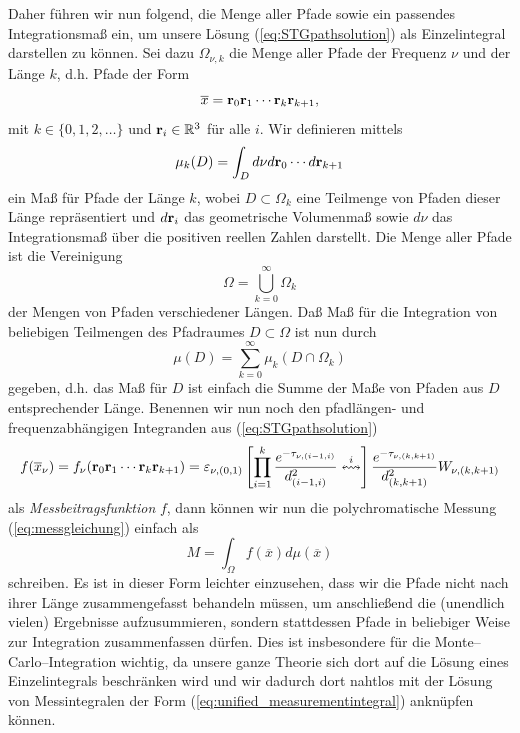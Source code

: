 	Daher führen wir nun \citet[][8.2]{Veach:1997p9136} folgend, die Menge aller Pfade sowie ein passendes Integrationsmaß ein, um unsere Lösung (\ref{eq:STGpathsolution}) als Einzelintegral darstellen zu können. Sei dazu $\Omega_{\nu,k}$ die Menge aller Pfade der Frequenz $\nu$ und der Länge $k$, d.h. Pfade der Form
	$${\overline x}=\mathbf{r}_0\mathbf{r}_1\cdots\mathbf{r}_k\mathbf{r}_{k+1},$$
	mit $k\in\{0,1,2,\dots\}$ und $\mathbf{r}_i \in \mathbb{R}^3$ für alle $i$. Wir definieren mittels
	$$\mu_k(D)=\int_D d\nu d\mathbf{r}_0\cdots d\mathbf{r}_{k+1}$$
	ein Maß für Pfade der Länge $k$, wobei $D\subset\Omega_k$ eine Teilmenge von Pfaden dieser Länge repräsentiert und $d\mathbf{r}_i$ das geometrische Volumenmaß sowie $d\nu$ das Integrationsmaß über die positiven reellen Zahlen darstellt. Die Menge aller Pfade ist die Vereinigung
	$$\Omega=\bigcup_{k=0}^\infty \Omega_k$$
	der Mengen von Pfaden verschiedener Längen. Daß Maß für die Integration von beliebigen Teilmengen des Pfadraumes $D\subset\Omega$ ist nun durch
	$$\mu(D)=\sum_{k=0}^\infty \mu_k(D\cap\Omega_k)$$
	gegeben, d.h. das Maß für $D$ ist einfach die Summe der Maße von Pfaden aus $D$ entsprechender Länge. Benennen wir nun noch den pfadlängen- und frequenzabhängigen Integranden aus (\ref{eq:STGpathsolution})
	\begin{equation}
		f({\overline x}_\nu)=f_\nu(\mathbf{r}_0\mathbf{r}_1\cdots\mathbf{r}_k\mathbf{r}_{k+1})=\varepsilon_{\nu,(0,1)}\left[\prod_{i=1}^k\frac{e^{-\tau_{\nu,(i-1,i)}}}{d_{(i-1,i)}^2}\overset{i}{\leftrightsquigarrow}\right]\frac{e^{-\tau_{\nu,(k,k+1)}}}{d_{(k,k+1)}^2} W_{\nu,(k,k+1)}
		\label{eq:mcf}
	\end{equation}
	als {\em Messbeitragsfunktion} $f$, dann können wir nun die polychromatische Messung (\ref{eq:messgleichung}) einfach als
	\begin{equation}
		M=\int_\Omega f({\overline x})d\mu({\overline x})
		\label{eq:unified_measurementintegral}
	\end{equation}
	schreiben. Es ist in dieser Form leichter einzusehen, dass wir die Pfade nicht nach ihrer Länge zusammengefasst behandeln müssen, um anschließend die (unendlich vielen) Ergebnisse aufzusummieren, sondern stattdessen Pfade in beliebiger Weise zur Integration zusammenfassen dürfen. Dies ist insbesondere für die Monte--Carlo--Integration wichtig, da unsere ganze Theorie sich dort auf die Lösung eines Einzelintegrals beschränken wird und wir dadurch dort nahtlos mit der Lösung von Messintegralen der Form (\ref{eq:unified_measurementintegral}) anknüpfen können.
